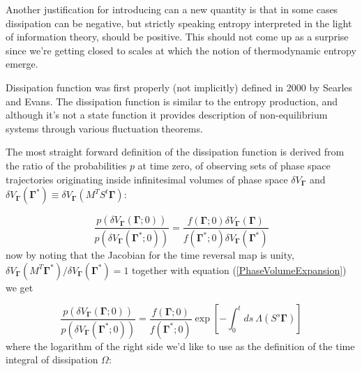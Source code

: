\documentclass[a4paper,12pt]{article}
\begin{document}
Another justification for introducing can a new quantity is that in some cases dissipation can be negative, but strictly speaking entropy interpreted in the light of information theory, should be positive. This should not come up as a surprise since we're getting closed to scales at which the notion of thermodynamic entropy emerge. 

%

Dissipation function was first properly (not implicitly) defined in 2000 by Searles and Evans\cite{Searles:2000ig}.
The dissipation function is similar to the entropy production, and although it's not a state function it provides description of non-equilibrium systems through various fluctuation theorems.

The most straight forward definition of the dissipation function is derived from the ratio of the probabilities $p$ at time zero, of observing sets of phase space trajectories originating inside infinitesimal volumes of phase space $\delta V_{\bm{\Gamma}}$ and $\delta V_{\bm{\Gamma}}(\bm{\Gamma}^*)\equiv \delta V_{\bm{\Gamma}}(M^T S^t \bm{\Gamma})$:

\begin{equation}
  \frac{p(\delta V_{\bm{\Gamma}}(\bm{\Gamma};0))}{p(\delta V_{\bm{\Gamma}}(\bm{\Gamma}^*;0))}= \frac{f(\bm{\Gamma};0)\delta V_{\bm{\Gamma}}(\bm{\Gamma})}{f(\bm{\Gamma}^*;0)\delta V_{\bm{\Gamma}}(\bm{\Gamma}^*)}
\end{equation}
now by noting that the Jacobian for the time reversal map is unity, 
\newline $ \delta V_{\bm{\Gamma}}(M^T \bm{\Gamma}^*)/ \delta V_{\bm{\Gamma}}(\bm{\Gamma}^*) =1 $ together with equation (\ref{PhaseVolumeExpansion}) we get


\begin{equation}
  \frac{p(\delta V_{\bm{\Gamma}}(\bm{\Gamma};0))}{p(\delta V_{\bm{\Gamma}}(\bm{\Gamma}^*;0))}=\frac{f(\bm{\Gamma};0)}{f(\bm{\Gamma}^*;0)} 
  \exp[-\int_0^t ds \ \Lambda(S^s \bm{\Gamma})]
\end{equation}
where the logarithm of the right side we'd like to use as the definition of the time integral of dissipation $\Omega$:
\end{document}
